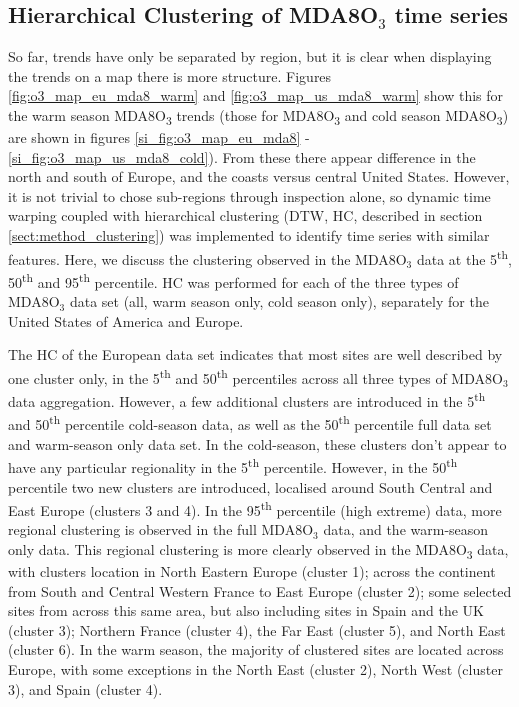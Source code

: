 \documentclass[journal abbreviation, manuscript]{copernicus}
\begin{document}

\subsection{Hierarchical Clustering of MDA8O$_3$ time series} \label{sect:clustering}

So far, trends have only be separated by region, but it is clear when displaying the trends on a map there is more structure. Figures \ref{fig:o3_map_eu_mda8_warm} and \ref{fig:o3_map_us_mda8_warm} show this for the warm season MDA8O\textsubscript{3} trends (those for MDA8O\textsubscript{3} and cold season MDA8O\textsubscript{3}) are shown in figures \ref{si_fig:o3_map_eu_mda8} - \ref{si_fig:o3_map_us_mda8_cold}). From these there appear difference in the north and south of Europe, and the coasts versus central United States. However, it is not trivial to chose sub-regions through inspection alone, so dynamic time warping coupled with hierarchical clustering (DTW, HC, described in section \ref{sect:method_clustering}) was implemented to identify time series with similar features. Here, we discuss the clustering observed in the MDA8O$_3$ data at the 5\textsuperscript{th}, 50\textsuperscript{th} and 95\textsuperscript{th} percentile. HC was performed for each of the three types of MDA8O$_3$ data set (all, warm season only, cold season only), separately for the United States of America and Europe. 

The HC of the European data set indicates that most sites are well described by one cluster only, in the 5\textsuperscript{th} and 50\textsuperscript{th} percentiles across all three types of MDA8O$_3$ data aggregation. However, a few additional clusters are introduced in the 5\textsuperscript{th} and 50\textsuperscript{th} percentile cold-season data, as well as the 50\textsuperscript{th} percentile full data set and warm-season only data set. In the cold-season, these clusters don't appear to have any particular regionality in the 5\textsuperscript{th} percentile. However, in the 50\textsuperscript{th} percentile two new clusters are introduced, localised around South Central and East Europe (clusters 3 and 4). In the 95\textsuperscript{th} percentile (high extreme) data, more regional clustering is observed in the full MDA8O$_3$ data, and the warm-season only data. This regional clustering is more clearly observed in the MDA8O\textsubscript{3} data, with clusters location in North Eastern Europe (cluster 1); across the continent from South and Central Western France to East Europe (cluster 2); some selected sites from across this same area, but also including sites in Spain and the UK (cluster 3); Northern France (cluster 4), the Far East (cluster 5), and North East (cluster 6). In the warm season, the majority of clustered sites are located across Europe, with some exceptions in the North East (cluster 2), North West (cluster 3), and Spain (cluster 4).
\end{document}
